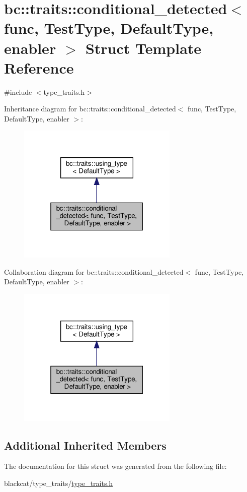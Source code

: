 \hypertarget{structbc_1_1traits_1_1conditional__detected}{}\section{bc\+:\+:traits\+:\+:conditional\+\_\+detected$<$ func, Test\+Type, Default\+Type, enabler $>$ Struct Template Reference}
\label{structbc_1_1traits_1_1conditional__detected}


{\ttfamily \#include $<$type\+\_\+traits.\+h$>$}



Inheritance diagram for bc\+:\+:traits\+:\+:conditional\+\_\+detected$<$ func, Test\+Type, Default\+Type, enabler $>$\+:\nopagebreak
\begin{figure}[H]
\begin{center}
\leavevmode
\includegraphics[width=217pt]{structbc_1_1traits_1_1conditional__detected__inherit__graph}
\end{center}
\end{figure}


Collaboration diagram for bc\+:\+:traits\+:\+:conditional\+\_\+detected$<$ func, Test\+Type, Default\+Type, enabler $>$\+:\nopagebreak
\begin{figure}[H]
\begin{center}
\leavevmode
\includegraphics[width=217pt]{structbc_1_1traits_1_1conditional__detected__coll__graph}
\end{center}
\end{figure}
\subsection*{Additional Inherited Members}


The documentation for this struct was generated from the following file\+:\begin{DoxyCompactItemize}
\item 
blackcat/type\+\_\+traits/\hyperlink{type__traits_2type__traits_8h}{type\+\_\+traits.\+h}\end{DoxyCompactItemize}
